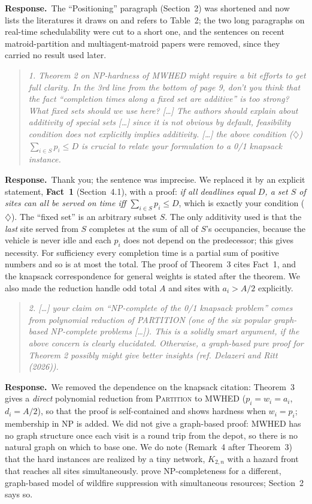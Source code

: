 \documentclass[11pt]{article}
\newenvironment{comment}{\par\medskip\begin{quote}\small\itshape}{\end{quote}}
\newcommand{\reply}{\noindent\textbf{Response.}\ }
\begin{document}
\reply The ``Positioning'' paragraph (Section~2) was shortened and now
lists the literatures it draws on and refers to Table~2; the two long
paragraphs on real-time schedulability were cut to a short one, and the
sentences on recent matroid-partition and multiagent-matroid papers were
removed, since they carried no result used later.

\begin{comment}
1. Theorem 2 on NP-hardness of MWHED might require a bit efforts to get
full clarity. In the 3rd line from the bottom of page 9, don't you think
that the fact ``completion times along a fixed set are additive'' is too
strong? What fixed sets should we use here? [\dots] The authors should
explain about additivity of special sets [\dots] since it is not obvious
by default, feasibility condition does not explicitly implies
additivity. [\dots] the above condition ($\diamondsuit$)
$\sum_{i\in S}p_i\le D$ is crucial to relate your formulation to a 0/1
knapsack instance.
\end{comment}

\reply Thank you; the sentence was imprecise. We replaced it by an
explicit statement, \textbf{Fact~1} (Section~4.1), with a proof:
\emph{if all deadlines equal $D$, a set $S$ of sites can all be served on
time iff $\sum_{i\in S}p_i\le D$}, which is exactly your condition
($\diamondsuit$). The ``fixed set'' is an arbitrary subset $S$. The only
additivity used is that the \emph{last} site served from $S$ completes
at the sum of all of $S$'s occupancies, because the vehicle is never idle
and each $p_i$ does not depend on the predecessor; this gives necessity.
For sufficiency every completion time is a partial sum of positive
numbers and so is at most the total. The proof of Theorem~3 cites Fact~1,
and the knapsack correspondence for general weights is stated after the
theorem. We also made the reduction handle odd total $A$ and sites with
$a_i>A/2$ explicitly.

\begin{comment}
2. [\dots] your claim on ``NP-complete of the 0/1 knapsack problem''
comes from polynomial reduction of PARTITION (one of the six popular
graph-based NP-complete problems [\dots]). This is a solidly smart
argument, if the above concern is clearly elucidated. Otherwise, a
graph-based pure proof for Theorem 2 possibly might give better insights
(ref. Delazeri and Ritt (2026)).
\end{comment}

\reply We removed the dependence on the knapsack citation: Theorem~3
gives a \emph{direct} polynomial reduction from \textsc{Partition} to
MWHED ($p_i=w_i=a_i$, $d_i=A/2$), so that the proof is self-contained
and shows hardness when $w_i=p_i$; membership in NP is added. We did
not give a graph-based proof: MWHED has no graph structure once each
visit is a round trip from the depot, so there is no natural graph on
which to base one. We do note (Remark~4 after Theorem~3) that the hard
instances are realized by a tiny network, $K_{2,n}$ with a hazard front
that reaches all sites simultaneously.
\citet{delazeri2026} prove NP-completeness for a different, graph-based
model of wildfire suppression with simultaneous resources; Section~2 says
so.
\end{document}
